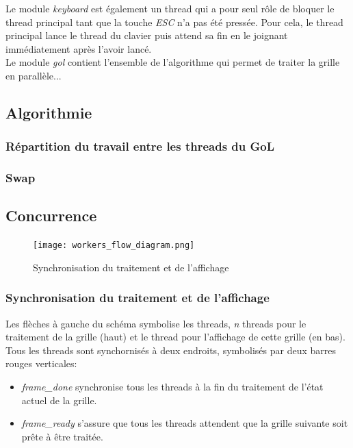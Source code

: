 \documentclass[11pt, a4paper]{article}
\begin{document}
Le module \textit{keyboard} est également un thread qui a pour seul rôle de bloquer le thread principal
tant que la touche \textit{ESC} n'a pas été pressée.
Pour cela, le thread principal lance le thread du clavier puis attend sa fin en le joignant immédiatement après l'avoir lancé. \\

Le module \textit{gol} contient l'ensemble de l'algorithme qui permet de traiter la grille en parallèle...

\subsection{Algorithmie}

\subsubsection{Répartition du travail entre les threads du GoL}

\subsubsection{Swap}

\newpage

\subsection{Concurrence}

\begin{figure}[H]
	\begin{center}
		\texttt{[image: workers\_flow\_diagram.png]}
	\end{center}
	\caption{Synchronisation du traitement et de l'affichage}
	\label{Synchronisation du traitement et de l'affichage}
\end{figure}

\subsubsection{Synchronisation du traitement et de l'affichage}

Les flèches à gauche du schéma symbolise les threads, \textit{n} threads pour le traitement de la grille (haut) et le thread pour l'affichage de cette grille (en bas). \\

Tous les threads sont synchornisés à deux endroits, symbolisés par deux barres rouges verticales:
\begin{itemize}
	\item \textit{frame\_done} synchronise tous les threads à la fin du traitement de l'état actuel de la grille.
	\item \textit{frame\_ready} s'assure que tous les threads attendent que la grille suivante soit prête à être traitée.
\end{itemize}
\end{document}
